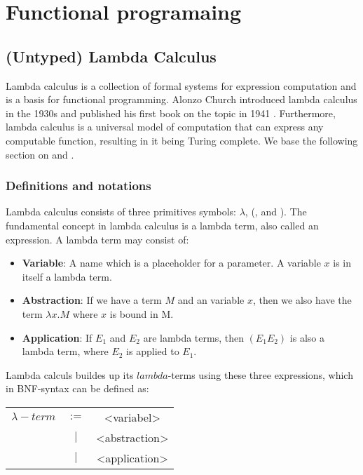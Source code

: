 \section{Functional programaing}

\subsection{(Untyped) Lambda Calculus}
\label{Lambda Calculus}
Lambda calculus is a collection of formal systems for expression computation and is a basis for functional programming. Alonzo Church introduced lambda calculus in the 1930s and published his first book on the topic in 1941 \autocite{ChurchAlonzo1985Tcol}. Furthermore, lambda calculus is a universal model of computation that can express any computable function, resulting in it being Turing complete. We base the following section on \autocite{RojasRaulLC} and \autocite{nederpelt_geuvers_lc}. 

\subsubsection{Definitions and notations}
Lambda calculus consists of three primitives symbols: $\lambda$, (, and ). The fundamental concept in lambda calculus is a lambda term, also called an expression. A lambda term may consist of: 

\begin{itemize}
    \item \textbf{Variable}: A name which  is a placeholder for a parameter. A variable $x$ is in itself a lambda term.
    \item \textbf{Abstraction}: If we have a term $M$ and an variable $x$, then we also have the term $\lambda x.M$ where $x$ is bound in M. 
    \item \textbf{Application}: If $E_1$ and $E_2$ are lambda terms, then $(E_1 E_2) $ is also a lambda term, where $E_2$ is applied to $E_1$.
\end{itemize}

Lambda calculs buildes up its $lambda$-terms using these three expressions, which in BNF-syntax can be defined as: 

\begin{table}[ht!]
    \centering
    \begin{tabular}{c c c}
         $\lambda -term$ & $:= $& <variabel> \\
         & $|$ & <abstraction> \\
         & $|$ & <application> \\
    \end{tabular}
\end{table}

